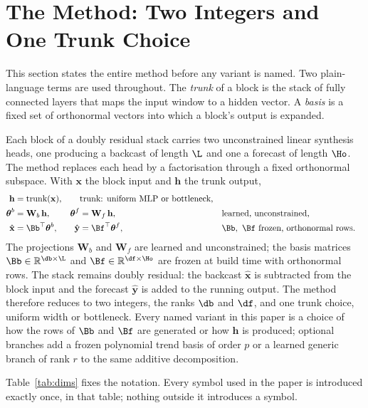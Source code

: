 \section{The Method: Two Integers and One Trunk Choice}\label{sec:method}

This section states the entire method before any variant is named. Two plain-language terms are
used throughout. The \emph{trunk} of a block is the stack of fully connected layers that maps
the input window to a hidden vector. A \emph{basis} is a fixed set of orthonormal vectors into
which a block's output is expanded.

Each block of a doubly residual stack \citep{oreshkin2020nbeats} carries two unconstrained
linear synthesis heads, one producing a backcast of length $\L$ and one a forecast of length
$\Ho$. The method replaces each head by a factorisation through a fixed orthonormal subspace.
With $\mathbf{x}$ the block input and $\mathbf{h}$ the trunk output,
\begin{align}
\mathbf{h} &= \operatorname{trunk}(\mathbf{x}),
  &&\text{trunk: uniform MLP or bottleneck,}
  \label{eq:trunk}\\
\boldsymbol{\theta}^{b} &= \mathbf{W}_{b}\,\mathbf{h},
  &\boldsymbol{\theta}^{f} &= \mathbf{W}_{f}\,\mathbf{h},
  &&\text{learned, unconstrained,}
  \label{eq:heads}\\
\hat{\mathbf{x}} &= \Bb^{\top}\boldsymbol{\theta}^{b},
  &\hat{\mathbf{y}} &= \Bf^{\top}\boldsymbol{\theta}^{f},
  &&\Bb,\ \Bf\ \text{frozen, orthonormal rows.}
  \label{eq:synthesis}
\end{align}
The projections $\mathbf{W}_{b}$ and $\mathbf{W}_{f}$ are learned and unconstrained; the basis
matrices $\Bb \in \mathbb{R}^{\db \times \L}$ and $\Bf \in \mathbb{R}^{\df \times \Ho}$ are
frozen at build time with orthonormal rows. The stack remains doubly residual: the backcast
$\hat{\mathbf{x}}$ is subtracted from the block input and the forecast $\hat{\mathbf{y}}$ is
added to the running output. The method therefore reduces to two integers, the ranks $\db$ and
$\df$, and one trunk choice, uniform width or bottleneck. Every named variant in this paper is a
choice of how the rows of $\Bb$ and $\Bf$ are generated or how $\mathbf{h}$ is produced;
optional branches add a frozen polynomial trend basis of order $p$ or a learned generic branch
of rank $r$ to the same additive decomposition.

Table~\ref{tab:dims} fixes the notation. Every symbol used in the paper is introduced exactly
once, in that table; nothing outside it introduces a symbol.

